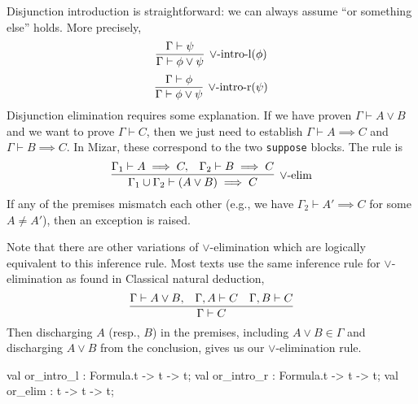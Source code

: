 \begin{node}
Disjunction introduction is straightforward: we can always assume ``or
something else'' holds. More precisely,
\begin{equation}
\vcenter{\infer[\lor\mbox{-intro-l}(\phi)]{\Gamma\vdash\phi\lor\psi}{\Gamma\vdash\psi}}
\end{equation}
\begin{equation}
\vcenter{\infer[\lor\mbox{-intro-r}(\psi)]{\Gamma\vdash\phi\lor\psi}{\Gamma\vdash\phi}}
\end{equation}
Disjunction elimination requires some explanation. If we have proven
$\Gamma\vdash A\lor B$ and we want to prove $\Gamma\vdash C$, then we
just need to establish $\Gamma\vdash A\implies C$ and $\Gamma\vdash B\implies C$.
In Mizar, these correspond to the two \texttt{suppose} blocks. The
rule is 
\begin{equation}
\vcenter{\infer[\lor\mbox{-elim}]{\Gamma_{1}\cup\Gamma_{2}\vdash(A\lor B)\implies C}{\Gamma_{1}\vdash A\implies C,&\Gamma_{2}\vdash B\implies C}}
\end{equation}
If any of the premises mismatch each other (e.g., we have
$\Gamma_{2}\vdash A'\implies C$ for some $A\neq A'$), then an
exception is raised.

Note that there are other variations of $\lor$-elimination which are
logically equivalent to this inference rule. Most texts use the same
inference rule for $\lor$-elimination as found in Classical natural
deduction,
\begin{equation}
\vcenter{\infer{\Gamma\vdash C}{\Gamma\vdash A\lor B, & \Gamma,A\vdash C & \Gamma,B\vdash C}}
\end{equation}
Then discharging $A$ (resp., $B$) in the premises, including $A\lor B\in\Gamma$
and discharging $A\lor B$ from the conclusion, gives us our
$\lor$-elimination rule.
\end{node}

\nwenddocs{}\plusendmoddef\nwstartdeflinemarkup{}\nwenddeflinemarkup
val or_intro_l : Formula.t -> t -> t;
val or_intro_r : Formula.t -> t -> t;
val or_elim : t -> t -> t;
\nwendcode{}\nwdocspar

